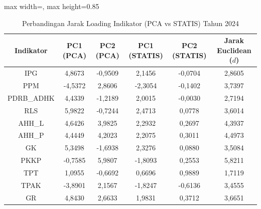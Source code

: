 \begin{table}[H]
\centering
\caption{Perbandingan Jarak Loading Indikator (PCA vs STATIS) Tahun 2024} \label{tab:app2jarak_loading_2024}
\begin{adjustbox}{max width=\textwidth, max height=0.85\textheight}
\begin{tabular}{|c|c|c|c|c|c|}
\hline
\textbf{Indikator} & \textbf{PC1 (PCA)} & \textbf{PC2 (PCA)} & \textbf{PC1 (STATIS)} & \textbf{PC2 (STATIS)} & \textbf{Jarak Euclidean ($d$)} \\
\hline
IPG & 4,8673 & -0,9509 & 2,1456 & -0,0704 & 2,8605 \\
PPM & -4,5372 & 2,8606 & -2,3054 & -0,1402 & 3,7397 \\
PDRB\_ADHK & 4,4339 & -1,2189 & 2,0015 & -0,0030 & 2,7194 \\
RLS & 5,9822 & -0,7244 & 2,4713 & 0,0778 & 3,6014 \\
AHH\_L & 4,6426 & 3,9825 & 2,2932 & 0,2697 & 4,3937 \\
AHH\_P & 4,4449 & 4,2023 & 2,2075 & 0,3011 & 4,4973 \\
GK & 5,3498 & -1,6938 & 2,3276 & 0,0880 & 3,5084 \\
PKKP & -0,7585 & 5,9807 & -1,8093 & 0,2553 & 5,8211 \\
TPT & 1,0955 & -0,6692 & 0,6696 & 0,9889 & 1,7119 \\
TPAK & -3,8901 & 2,1567 & -1,8247 & -0,6136 & 3,4555 \\
GR & 4,8430 & 2,6633 & 1,9831 & 0,3712 & 3,6651 \\
\hline
\end{tabular}
\end{adjustbox}
\end{table}